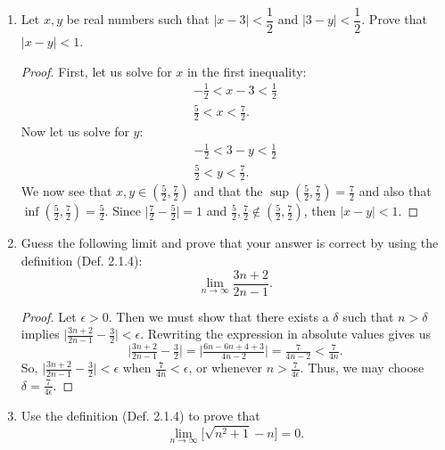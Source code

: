 \documentclass{article}
\begin{document}
\begin{enumerate}
        \item Let $x, y$ be real numbers such that $|x-3| < \dfrac{1}{2}$ and $|3-y| < \dfrac{1}{2}$. Prove that $|x-y| < 1$.
            \begin{proof}
                First, let us solve for $x$ in the first inequality:
                \begin{gather*}
                    -\frac{1}{2} < x-3 < \frac{1}{2}\\
                    \frac{5}{2} < x < \frac{7}{2}.
                \end{gather*}
                Now let us solve for $y$:
                \begin{gather*}
                    -\frac{1}{2} < 3-y < \frac{1}{2}\\
                    \frac{5}{2} < y < \frac{7}{2}.
                \end{gather*}
                We now see that $x,y \in (\frac{5}{2}, \frac{7}{2})$ and that the $\sup(\frac{5}{2}, \frac{7}{2}) = \frac{7}{2}$ and also that $\inf (\frac{5}{2}, \frac{7}{2}) = \frac{5}{2}$. Since $\big|\frac{7}{2} - \frac{5}{2}\big| = 1$ and $\frac{5}{2}, \frac{7}{2} \notin (\frac{5}{2}, \frac{7}{2})$, then $|x-y| < 1$. 
                
            \end{proof}
        
        \item Guess the following limit and prove that your answer is correct by using the definition (Def. 2.1.4):
            \[\lim_{n \to \infty} \frac{3n+2}{2n-1}.\]
        
            \begin{proof}
                Let $\epsilon > 0$. Then we must show that there exists a $\delta$ such that $n > \delta$ implies $\Big|\tfrac{3n+2}{2n-1} - \tfrac{3}{2}\Big| < \epsilon$. Rewriting the expression in absolute values gives us
                    \[\Big|\tfrac{3n+2}{2n-1} - \tfrac{3}{2}\Big| = \Big|\tfrac{6n-6n+4+3}{4n-2}\Big| = \tfrac{7}{4n-2} < \tfrac{7}{4n}.\]
                So, $\Big|\tfrac{3n+2}{2n-1} - \tfrac{3}{2}\Big| < \epsilon$ when $\tfrac{7}{4n} < \epsilon$, or whenever $n > \tfrac{7}{4\epsilon}$. Thus, we may choose $\delta = \tfrac{7}{4\epsilon}$.
                
            \end{proof}
        
        \item Use the definition (Def. 2.1.4) to prove that
            \[\lim_{n \to \infty} \Big[\sqrt{n^2+1}-n\Big] = 0.\]


\end{enumerate}
\end{document}
